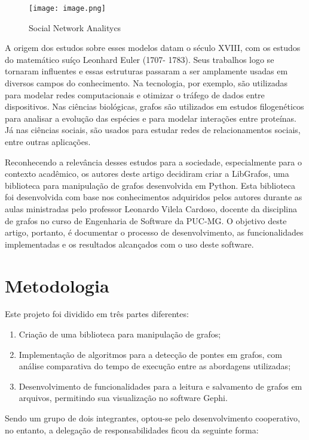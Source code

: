 \documentclass[12pt]{article}
\begin{document}
\begin{figure}
    \centering
    \texttt{[image: image.png]}
    \caption{Social Network Analitycs}
    \label{fig:enter-label}
\end{figure}

A origem dos estudos sobre esses modelos datam o século XVIII, com os estudos do matemático suíço Leonhard Euler (1707-
1783). Seus trabalhos logo se tornaram influentes e essas estruturas passaram a ser amplamente usadas em diversos campos do conhecimento. Na tecnologia, por exemplo, são utilizadas para modelar redes computacionais e otimizar o tráfego de dados entre dispositivos. Nas ciências biológicas, grafos são utilizados em estudos filogenéticos para analisar a evolução das espécies e para modelar interações entre proteínas. Já nas ciências sociais, são usados para estudar redes de relacionamentos sociais, entre outras aplicações.

Reconhecendo a relevância desses estudos para a sociedade, especialmente para o contexto acadêmico, os autores deste artigo decidiram criar a LibGrafos, uma biblioteca para manipulação de grafos desenvolvida em Python. Esta biblioteca foi desenvolvida com base nos conhecimentos adquiridos pelos autores durante as aulas ministradas pelo professor Leonardo Vilela Cardoso, docente da disciplina de grafos no curso de Engenharia de Software da PUC-MG. O objetivo deste artigo, portanto, é documentar o processo de desenvolvimento, as funcionalidades implementadas e os resultados alcançados com o uso deste software. 

\section{Metodologia}

Este projeto foi dividido em três partes diferentes: 
\begin{enumerate}
    \item Criação de uma biblioteca para manipulação de grafos;
    \item Implementação de algoritmos para a detecção de pontes em grafos, com análise comparativa do tempo de execução entre as abordagens utilizadas;
    \item Desenvolvimento de funcionalidades para a leitura e salvamento de grafos em arquivos, permitindo sua visualização no software Gephi.
\end{enumerate}

Sendo um grupo de dois integrantes, optou-se pelo desenvolvimento cooperativo, no entanto, a delegação de responsabilidades ficou da seguinte forma:
\end{document}

